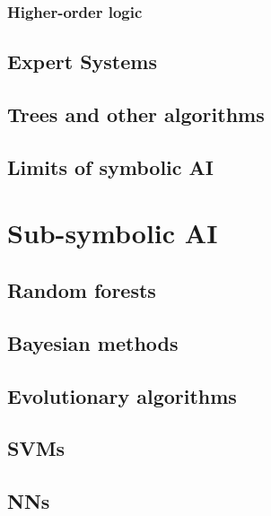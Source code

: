 \documentclass[12pt,a4paper,openright,twoside]{book}
\begin{document}
\subsubsection{Higher-order logic}\label{subsubsec:higher-order-logic}

\subsection{Expert Systems}\label{subsec:expert-systems}

\subsection{Trees and other algorithms}\label{subsec:trees-and-other-algorithms}

\subsection{Limits of symbolic \ac{AI}}\label{subsec:limits-of-symbolic-ai}

\section{Sub-symbolic \ac{AI}}\label{sec:sub-symbolic-ai}

\subsection{Random forests}\label{subsec:random-forests}

\subsection{Bayesian methods}\label{subsec:bayesian-methods}

\subsection{Evolutionary algorithms}\label{subsec:evolutionary-algorithms}

\subsection{\Aclp{SVM}}\label{subsec:svm}

\subsection{\Aclp{NN}}\label{subsec:neural-networks}
\end{document}
